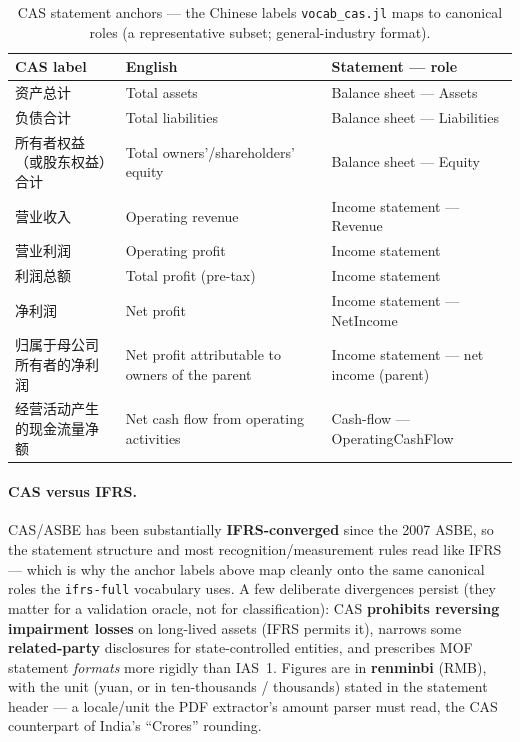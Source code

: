 \documentclass[11pt,a4paper]{report}
\newcommand{\cncjk}[2]{{\cjkCNfont #1}}
\begin{document}
\begin{table}[h]
\centering
\small
\caption{CAS statement anchors --- the Chinese labels \texttt{vocab\_cas.jl} maps to canonical roles (a
representative subset; general-industry format).}
\label{tab:china-cas-anchors}
\begin{tabular}{@{}p{}p{}p{}@{}}
\toprule
\textbf{CAS label} & \textbf{English} & \textbf{Statement --- role} \\
\midrule
\cncjk{资产总计}{} & Total assets & Balance sheet --- Assets \\
\cncjk{负债合计}{} & Total liabilities & Balance sheet --- Liabilities \\
\cncjk{所有者权益（或股东权益）合计}{} & Total owners'/shareholders' equity & Balance sheet --- Equity \\
\cncjk{营业收入}{} & Operating revenue & Income statement --- Revenue \\
\cncjk{营业利润}{} & Operating profit & Income statement \\
\cncjk{利润总额}{} & Total profit (pre-tax) & Income statement \\
\cncjk{净利润}{} & Net profit & Income statement --- NetIncome \\
\cncjk{归属于母公司所有者的净利润}{} & Net profit attributable to owners of the parent & Income statement --- net income (parent) \\
\cncjk{经营活动产生的现金流量净额}{} & Net cash flow from operating activities & Cash-flow --- OperatingCashFlow \\
\bottomrule
\end{tabular}
\end{table}

\paragraph{CAS versus IFRS.} CAS/ASBE has been substantially \textbf{IFRS-converged}
since the 2007 ASBE, so the statement structure and most recognition/measurement rules read like IFRS ---
which is why the anchor labels above map cleanly onto the same canonical roles the \texttt{ifrs-full}
vocabulary uses. A few deliberate divergences persist (they matter for a validation oracle, not for
classification): CAS \textbf{prohibits reversing impairment losses} on long-lived assets (IFRS permits it),
narrows some \textbf{related-party} disclosures for state-controlled entities, and prescribes MOF statement
\emph{formats} more rigidly than IAS~1. Figures are in \textbf{renminbi} (RMB), with the
unit (yuan, or in ten-thousands / thousands) stated in the statement header --- a
locale/unit the PDF extractor's amount parser must read, the CAS counterpart of India's ``Crores''
rounding.
\end{document}
